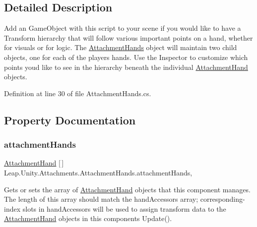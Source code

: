 \subsection{Detailed Description}
Add an Game\+Object with this script to your scene if you would like to have a Transform hierarchy that will follow various important points on a hand, whether for visuals or for logic. The \mbox{\hyperlink{class_leap_1_1_unity_1_1_attachments_1_1_attachment_hands}{Attachment\+Hands}} object will maintain two child objects, one for each of the player\textquotesingle{}s hands. Use the Inspector to customize which points you\textquotesingle{}d like to see in the hierarchy beneath the individual \mbox{\hyperlink{class_leap_1_1_unity_1_1_attachments_1_1_attachment_hand}{Attachment\+Hand}} objects. 



Definition at line 30 of file Attachment\+Hands.\+cs.



\subsection{Property Documentation}
\mbox{\label{class_leap_1_1_unity_1_1_attachments_1_1_attachment_hands_a4b6dfa27f95d4e5cb9b33131f5f837cc}} 
\subsubsection{\texorpdfstring{attachmentHands}{attachmentHands}}
{\footnotesize\ttfamily \mbox{\hyperlink{class_leap_1_1_unity_1_1_attachments_1_1_attachment_hand}{Attachment\+Hand}} \mbox{[}$\,$\mbox{]} Leap.\+Unity.\+Attachments.\+Attachment\+Hands.\+attachment\+Hands\hspace{0.3cm}{\ttfamily [get]}, {\ttfamily [set]}}



Gets or sets the array of \mbox{\hyperlink{class_leap_1_1_unity_1_1_attachments_1_1_attachment_hand}{Attachment\+Hand}} objects that this component manages. The length of this array should match the hand\+Accessors array; corresponding-\/index slots in hand\+Accessors will be used to assign transform data to the \mbox{\hyperlink{class_leap_1_1_unity_1_1_attachments_1_1_attachment_hand}{Attachment\+Hand}} objects in this component\textquotesingle{}s Update(). 

